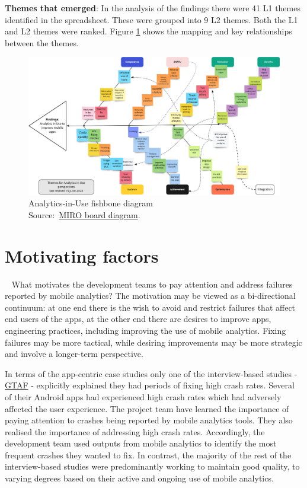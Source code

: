 \textbf{Themes that emerged}: 
%
In the analysis of the findings there were 41 L1 themes identified in the spreadsheet. These were grouped into  9 L2 themes. Both the L1 and L2 themes were ranked. Figure \ref{fig:analytics-in-use-fishbone-diagram} shows the mapping and key relationships between the themes.

\begin{figure}
    \centering
    \includegraphics[width=\textwidth]{images/rough-sketches/analytics-in-use-fishbone-diagram-15-jun-2022e.jpeg}
    \caption{Analytics-in-Use fishbone diagram\\Source:~\href{https://miro.com/app/board/uXjVOtbZPNw=/?share_link_id=876968062021}{MIRO board diagram}.}
    \label{fig:analytics-in-use-fishbone-diagram}
\end{figure}

\section{Motivating factors}~\label{aiu-motivating-factors-section}
What motivates the development teams to pay attention and address failures reported by mobile analytics? The motivation may be viewed as a bi-directional continuum: at one end there is the wish to avoid and restrict failures that affect end users of the apps, at the other end there are desires to improve apps, engineering practices, including improving the use of mobile analytics. Fixing failures may be more tactical, while desiring improvements may be more strategic and involve a longer-term perspective.

In terms of the app-centric case studies only one of the interview-based studies - \href{glossary-gtaf}{GTAF} - explicitly explained they had periods of fixing high crash rates. Several of their Android apps had experienced high crash rates which had adversely affected the user experience. The project team have learned the importance of paying attention to crashes being reported by mobile analytics tools. They also realised the importance of addressing high crash rates. Accordingly, the development team used outputs from mobile analytics to identify the most frequent crashes they wanted to fix. In contrast, the majority of the rest of the interview-based studies were predominantly working to maintain good quality, to varying degrees based on their active and ongoing use of mobile analytics.


